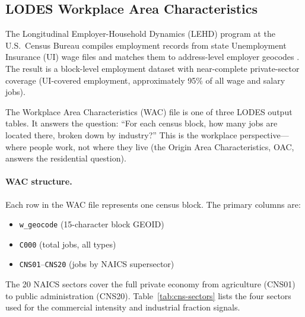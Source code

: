 \label{sec:background}

\subsection{LODES Workplace Area Characteristics}

The Longitudinal Employer-Household Dynamics (LEHD) program at the U.S.\
Census Bureau compiles employment records from state Unemployment Insurance
(UI) wage files and matches them to address-level employer geocodes
\citep{abowd2009lodes}.
The result is a block-level employment dataset with near-complete private-sector
coverage (UI-covered employment, approximately 95\% of all wage and salary jobs).

The Workplace Area Characteristics (WAC) file is one of three LODES output
tables.
It answers the question: ``For each census block, how many jobs are located
there, broken down by industry?''
This is the workplace perspective---where people work, not where they live
(the Origin Area Characteristics, OAC, answers the residential question).

\paragraph{WAC structure.}
Each row in the WAC file represents one census block.
The primary columns are:
\begin{itemize}
  \item \texttt{w\_geocode} (15-character block GEOID)
  \item \texttt{C000} (total jobs, all types)
  \item \texttt{CNS01}--\texttt{CNS20} (jobs by NAICS supersector)
\end{itemize}

The 20 NAICS sectors cover the full private economy from agriculture
(CNS01) to public administration (CNS20).
Table~\ref{tab:cns-sectors} lists the four sectors used for the commercial
intensity and industrial fraction signals.

